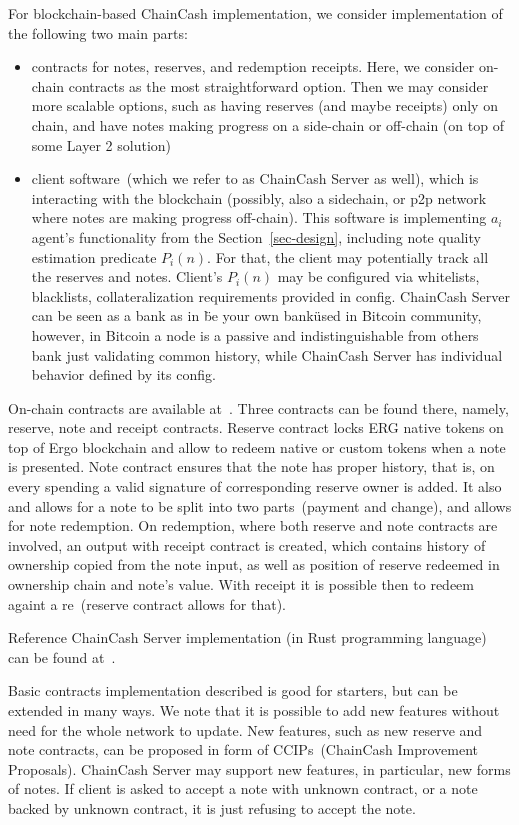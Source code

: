 \documentclass{llncs}   %
\newcommand{\cc}{ChainCash}
\begin{document}
For blockchain-based \cc{} implementation, we consider implementation of the following two main parts:

\begin{itemize}
  \item{} contracts for notes, reserves, and redemption receipts. Here, we consider on-chain contracts as the most
  straightforward option. Then we may consider more scalable options, such as having reserves (and maybe receipts) only
  on chain, and have notes making progress on a side-chain or off-chain (on top of some Layer 2 solution)
  \item{} client software~(which we refer to as \cc{} Server as well), which is interacting with the blockchain (possibly, also a sidechain, or p2p network
  where notes are making progress off-chain). This software is implementing $a_i$ agent's functionality from the Section~\ref{sec-design},
  including note quality estimation predicate $P_i(n)$. For that, the client may potentially track all the reserves and notes.
  Client's $P_i(n)$ may be configured via whitelists, blacklists, collateralization requirements provided in config.
  \cc{} Server can be seen as a bank as in \"be your own bank\" used in Bitcoin community, however, in Bitcoin a node
  is a passive and indistinguishable from others bank just validating common history, while \cc{} Server has individual behavior defined by its config.
\end{itemize}

On-chain contracts are available at~\cite{contracts}. Three contracts can be found there, namely, reserve, note and receipt contracts. Reserve contract locks ERG native tokens on top of Ergo blockchain and allow to redeem native or custom tokens when a note is presented. Note contract ensures that the note has proper history, that is, on every spending a valid signature of corresponding reserve owner is added. It also and allows for a note to be split into two parts~(payment and change), and allows for note redemption.
On redemption, where both reserve and note contracts are involved, an output with receipt contract is created, which contains history of ownership copied from the note input, as well as position of reserve redeemed in ownership chain and note's value. With receipt it is possible then to redeem againt a re~(reserve contract allows for that).

Reference \cc{} Server implementation (in Rust programming language) can be found at~\cite{server}.

Basic contracts implementation described is good for starters, but can be extended in many ways.  We note that it is possible
to add new features without need for the whole network to update. New features, such as new reserve and note contracts,
can be proposed in form of CCIPs~(ChainCash Improvement Proposals). ChainCash
Server may support new features, in particular, new forms of notes. If client is asked to accept a note with unknown
contract, or a note backed by unknown contract, it is just refusing to accept the note.
\end{document}
